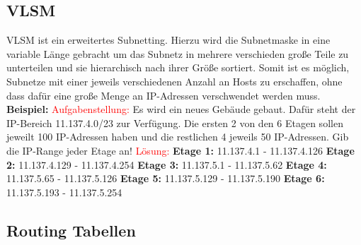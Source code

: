 \documentclass[12pt,a4paper]{article}
\begin{document}
\subsection{VLSM}
    VLSM ist ein erweitertes Subnetting. Hierzu wird die Subnetmaske in eine variable Länge gebracht um das Subnetz in mehrere verschieden große Teile zu unterteilen und sie hierarchisch nach ihrer Größe sortiert. Somit ist es möglich, Subnetze mit einer jeweils verschiedenen Anzahl an Hosts zu erschaffen, ohne dass dafür eine große Menge an IP-Adressen verschwendet werden muss.\newline
    \hspace{2cm}
    \textbf{Beispiel:}\newline
    \textcolor{red}{Aufgabenstellung:}\newline
    Es wird ein neues Gebäude gebaut. Dafür steht der IP-Bereich 11.137.4.0/23 zur Verfügung. Die ersten 2 von den 6 Etagen sollen jeweilt 100 IP-Adressen haben und die restlichen 4 jeweils 50 IP-Adressen.
    Gib die IP-Range jeder Etage an!\newline
    \textcolor{red}{Lösung:}\newline
    \textbf{Etage 1:} 11.137.4.1   -  11.137.4.126\newline
    \textbf{Etage 2:} 11.137.4.129 -  11.137.4.254\newline
    \textbf{Etage 3:} 11.137.5.1   -  11.137.5.62 \newline
    \textbf{Etage 4:} 11.137.5.65  -  11.137.5.126\newline
    \textbf{Etage 5:} 11.137.5.129 -  11.137.5.190\newline
    \textbf{Etage 6:} 11.137.5.193 -  11.137.5.254\newline

\subsection{Routing Tabellen}%
\end{document}
